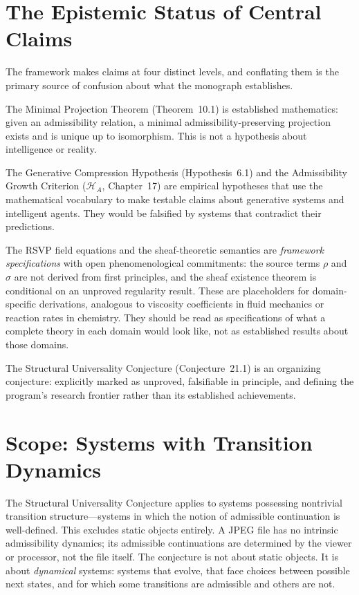 \documentclass[12pt, oneside]{book}
\theoremstyle{flyxion}
\theoremstyle{definition}
\begin{document}
\section{The Epistemic Status of Central Claims}

The framework makes claims at four distinct levels, and conflating
them is the primary source of confusion about what the monograph
establishes.

The Minimal Projection Theorem (Theorem~10.1) is established
mathematics: given an admissibility relation, a minimal
admissibility-preserving projection exists and is unique up to
isomorphism. This is not a hypothesis about intelligence or reality.

The Generative Compression Hypothesis (Hypothesis~6.1) and the
Admissibility Growth Criterion ($\mathcal{H}_A$, Chapter~17) are
empirical hypotheses that use the mathematical vocabulary to make
testable claims about generative systems and intelligent agents. They
would be falsified by systems that contradict their predictions.

The RSVP field equations and the sheaf-theoretic semantics are
\emph{framework specifications} with open phenomenological commitments:
the source terms $\rho$ and $\sigma$ are not derived from first
principles, and the sheaf existence theorem is conditional on an
unproved regularity result. These are placeholders for domain-specific
derivations, analogous to viscosity coefficients in fluid mechanics
or reaction rates in chemistry. They should be read as specifications
of what a complete theory in each domain would look like, not as
established results about those domains.

The Structural Universality Conjecture (Conjecture~21.1) is an
organizing conjecture: explicitly marked as unproved, falsifiable in
principle, and defining the program's research frontier rather than
its established achievements.

\section{Scope: Systems with Transition Dynamics}

The Structural Universality Conjecture applies to systems possessing
nontrivial transition structure---systems in which the notion of
admissible continuation is well-defined. This excludes static objects
entirely. A JPEG file has no intrinsic admissibility dynamics; its
admissible continuations are determined by the viewer or processor,
not the file itself. The conjecture is not about static objects. It
is about \emph{dynamical} systems: systems that evolve, that face
choices between possible next states, and for which some transitions
are admissible and others are not.
\end{document}
